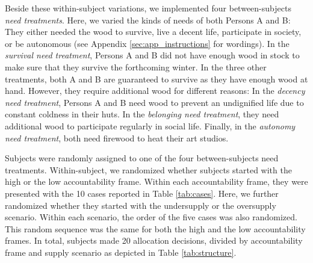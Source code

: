 \documentclass[egregdoesnotlikesansseriftitles]{scrartcl}
\begin{document}
Beside these within-subject variations, we implemented four between-subjects \textit{need treatments}.
Here, we varied the kinds of needs of both Persons A and B: They either needed the wood to survive, live a decent life, participate in society, or be autonomous (see Appendix \ref{sec:app_instructions} for wordings).
In the \textit{survival need treatment}, Persons A and B did not have enough wood in stock to make sure that they survive the forthcoming winter.
In the three other treatments, both A and B are guaranteed to survive as they have enough wood at hand.
However, they require additional wood for different reasons:
In the \textit{decency need treatment}, Persons A and B need wood to prevent an undignified life due to constant coldness in their huts.
In the \textit{belonging need treatment}, they need additional wood to participate regularly in social life.
Finally, in the \textit{autonomy need treatment}, both need firewood to heat their art studios.

Subjects were randomly assigned to one of the four between-subjects need treatments.
Within-subject, we randomized whether subjects started with the high or the low accountability frame.
Within each accountability frame, they were presented with the 10 cases reported in Table \ref{tab:cases}.
Here, we further randomized whether they started with the undersupply or the oversupply scenario.
Within each scenario, the order of the five cases was also randomized.
This random sequence was the same for both the high and the low accountability frames.
In total, subjects made 20 allocation decisions, divided by accountability frame and supply scenario as depicted in Table  \ref{tab:structure}.
\end{document}
